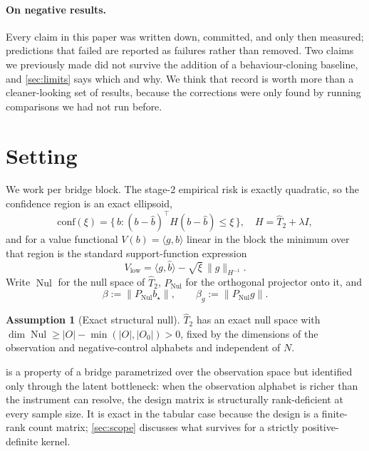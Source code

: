 \documentclass{article}
\theoremstyle{plain}
\theoremstyle{definition}
\newtheorem{assumption}{Assumption}
\DeclareMathOperator{\Nul}{Nul}
\newcommand{\Pnul}{P_{\Nul}}
\newcommand{\btrue}{b_{\star}}
\newcommand{\bhat}{\hat{b}}
\newcommand{\Vlow}{V_{\mathrm{low}}}
\begin{document}
\paragraph{On negative results.}
Every claim in this paper was written down, committed, and only then measured;
predictions that failed are reported as failures rather than removed. Two claims
we previously made did not survive the addition of a behaviour-cloning baseline,
and \cref{sec:limits} says which and why. We think that record is worth more than
a cleaner-looking set of results, because the corrections were only found by
running comparisons we had not run before.


\section{Setting}
\label{sec:setting}

We work per bridge block. The stage-2 empirical risk is exactly quadratic, so the
confidence region is an exact ellipsoid,
\begin{equation}
\mathrm{conf}(\xi) = \{\, b : (b-\bhat)^\top H (b-\bhat) \le \xi \,\},
\quad H = \hat T_2 + \lambda I,
\label{eq:region}
\end{equation}
and for a value functional $V(b)=\langle g,b\rangle$ linear in the block the
minimum over that region is the standard support-function expression
\begin{equation}
\Vlow = \langle g,\bhat\rangle - \sqrt{\xi}\,\lVert g\rVert_{H^{-1}} .
\label{eq:support}
\end{equation}
Write $\Nul$ for
the null space of $\hat T_2$, $\Pnul$ for the orthogonal projector onto it, and
\begin{equation}
\beta := \lVert \Pnul \btrue \rVert,
\qquad
\beta_g := \lVert \Pnul g \rVert .
\label{eq:betas}
\end{equation}

\begin{assumption}[Exact structural null]
\label{as:null}
$\hat T_2$ has an exact null space with
$\dim \Nul \ge |O| - \min(|O|,|O_0|) > 0$, fixed by the dimensions of the
observation and negative-control alphabets and independent of $N$.
\end{assumption}

 is a property of a bridge parametrized over the observation space
but identified only through the latent bottleneck: when the observation alphabet
is richer than the instrument can resolve, the design matrix is structurally
rank-deficient at every sample size. It is exact in the tabular case because the
design is a finite-rank count matrix; \cref{sec:scope} discusses what survives
for a strictly positive-definite kernel.
\end{document}
